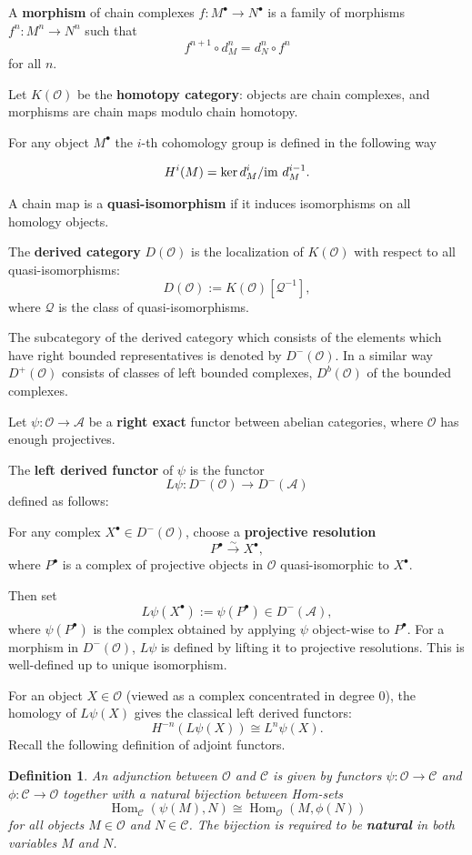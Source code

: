 \documentclass[10pt]{amsart}
\newtheorem{definition}[theorem]{Definition}
\begin{document}
	A \textbf{morphism} of chain complexes \( f: M^\bullet \to N^\bullet \) is a family of morphisms \( f^n: M^n \to N^n \) such that
	\[
	f^{n+1} \circ d_M^n = d_N^n \circ f^n
	\]
	for all \( n \).
	
	
	Let \( K(\mathcal{O}) \) be the \textbf{homotopy category}: objects are chain complexes, and morphisms are chain maps modulo chain homotopy.
	
	For any object $M^\bullet$ the $i$-th cohomology group is defined in the following way
	
	\[H^{i}(M)=\ker d_M^{i}/{\rm im} ~d_{M}^{i-1}.\]
	
	A chain map is a \textbf{quasi-isomorphism} if it induces isomorphisms on all homology objects.
	
	The \textbf{derived category} \( D(\mathcal{O}) \) is the localization of \( K(\mathcal{O}) \) with respect to all quasi-isomorphisms:
	\[
	D(\mathcal{O}) := K(\mathcal{O})[\mathcal{Q}^{-1}],
	\]
	where \( \mathcal{Q} \) is the class of quasi-isomorphisms.
	
	The subcategory of the derived category which consists of the elements which have right bounded representatives is denoted by $D^-(\mathcal{O})$. In a similar way $D^+(\mathcal{O})$ consists of classes of left bounded complexes, $D^b(\mathcal{O})$ of the bounded complexes.
	
	Let \(\psi: \mathcal{O} \to \mathcal{A}\) be a \textbf{right exact} functor between abelian categories, where \(\mathcal{O}\) has enough projectives.
	
	
	The \textbf{left derived functor} of \(\psi\) is the functor
	\[
	L\psi: D^-(\mathcal{O}) \longrightarrow D^-(\mathcal{A})
	\]
	defined as follows:
	
	For any complex \(X^\bullet \in D^-(\mathcal{O})\), choose a \textbf{projective resolution} 
	\[
	P^\bullet \xrightarrow{\sim} X^\bullet,
	\]
	where \(P^\bullet\) is a complex of projective objects in \(\mathcal{O}\) quasi-isomorphic to \(X^\bullet\).
	
	Then set
	\[
	L\psi(X^\bullet) := \psi(P^\bullet) \in D^-(\mathcal{A}),
	\]
	where \(\psi(P^\bullet)\) is the complex obtained by applying \(\psi\) object-wise to \(P^\bullet\).
	For a morphism in \(D^-(\mathcal{O})\), \(L\psi\) is defined by lifting it to projective resolutions. This is well-defined up to unique isomorphism.
	
	For an object \(X \in \mathcal{O}\) (viewed as a complex concentrated in degree 0), the homology of \(L\psi(X)\) gives the classical left derived functors:
	\[
	H^{-n}(L\psi(X)) \cong L^n\psi(X).
	\]
	Recall the following definition of adjoint functors.
	\begin{definition}\label{def:Adjunction}    
		An adjunction between \(\mathcal{O}\) and \(\mathcal{C}\) is given by functors 
		\(\psi: \mathcal{O} \to \mathcal{C}\) and \(\phi: \mathcal{C} \to \mathcal{O}\) 
		together with a natural bijection between Hom-sets
		\[
		\operatorname{Hom}_{\mathcal{C}}(\psi(M), N) \cong \operatorname{Hom}_{\mathcal{O}}(M, \phi(N))
		\]
		for all objects \(M \in \mathcal{O}\) and \(N \in \mathcal{C}\). 
		The bijection is required to be \textbf{natural} in both variables \(M\) and \(N\).
	\end{definition}
	
\end{document}
